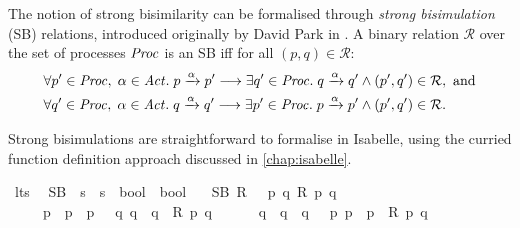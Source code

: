 \begin{isabellebody}
\begin{isamarkuptext}
The notion of strong bisimilarity can be formalised through \emph{strong bisimulation} (SB) relations, introduced originally by David Park in \cite{park81}. A binary relation $\mathcal{R}$ over the set of processes $\mathit{Proc}$ is an SB iff for all $(p,q) \in \mathcal{R}$:
\begin{align*}
&\forall p' \in \mathit{Proc},\; \alpha \in \mathit{Act} .\; p \xrightarrow{\alpha} p' \longrightarrow
\exists q' \in \mathit{Proc} .\; q \xrightarrow{\alpha} q' \wedge (p',q') \in \mathcal{R}, \text{ and}\\
&\forall q' \in \mathit{Proc},\; \alpha \in \mathit{Act} .\; q \xrightarrow{\alpha} q' \longrightarrow
\exists p' \in \mathit{Proc} .\; p \xrightarrow{\alpha} p' \wedge (p',q') \in \mathcal{R}.
\end{align*}%
\end{isamarkuptext}\isamarkuptrue%
%
\isadelimdocument
%
\endisadelimdocument
%
\isatagdocument
%
\isamarkuptrue%
%
\endisatagdocument
{\isafolddocument}%
%
\isadelimdocument
%
\endisadelimdocument
%
\begin{isamarkuptext}%
Strong bisimulations are straightforward to formalise in Isabelle, using the curried function definition approach discussed in \cref{chap:isabelle}.%
\end{isamarkuptext}\isamarkuptrue%
\isamarkupfalse%
\ lts\ \isanewline
\isanewline
%
\isanewline
{}\isamarkupfalse%
\ SB\ {\isacharcolon}{\kern0pt}{\isacharcolon}{\kern0pt}\ {\isacartoucheopen}{\isacharparenleft}{\kern0pt}{\isacharprime}{\kern0pt}s\ {\isasymRightarrow}\ {\isacharprime}{\kern0pt}s\ {\isasymRightarrow}\ bool{\isacharparenright}{\kern0pt}\ {\isasymRightarrow}\ bool{\isacartoucheclose}\isanewline
\ \ \ {\isacartoucheopen}SB\ R\ {\isasymequiv}\ {\isasymforall}\ p\ q{\isachardot}{\kern0pt}\ R\ p\ q\ {\isasymlongrightarrow}\ \isanewline
\ \ \ \ {\isacharparenleft}{\kern0pt}{\isasymforall}\ p{\isacharprime}{\kern0pt}\ {\isasymalpha}{\isachardot}{\kern0pt}\ p\ {\isasymlongmapsto}{\isasymalpha}\ p{\isacharprime}{\kern0pt}\ {\isasymlongrightarrow}\ {\isacharparenleft}{\kern0pt}{\isasymexists}\ q{\isacharprime}{\kern0pt}{\isachardot}{\kern0pt}\ {\isacharparenleft}{\kern0pt}q\ {\isasymlongmapsto}{\isasymalpha}\ q{\isacharprime}{\kern0pt}{\isacharparenright}{\kern0pt}\ {\isasymand}\ R\ p{\isacharprime}{\kern0pt}\ q{\isacharprime}{\kern0pt}{\isacharparenright}{\kern0pt}{\isacharparenright}{\kern0pt}\ {\isasymand}\isanewline
\ \ \ \ {\isacharparenleft}{\kern0pt}{\isasymforall}\ q{\isacharprime}{\kern0pt}\ {\isasymalpha}{\isachardot}{\kern0pt}\ q\ {\isasymlongmapsto}{\isasymalpha}\ q{\isacharprime}{\kern0pt}\ {\isasymlongrightarrow}\ {\isacharparenleft}{\kern0pt}{\isasymexists}\ p{\isacharprime}{\kern0pt}{\isachardot}{\kern0pt}\ {\isacharparenleft}{\kern0pt}p\ {\isasymlongmapsto}{\isasymalpha}\ p{\isacharprime}{\kern0pt}{\isacharparenright}{\kern0pt}\ {\isasymand}\ R\ p{\isacharprime}{\kern0pt}\ q{\isacharprime}{\kern0pt}{\isacharparenright}{\kern0pt}{\isacharparenright}{\kern0pt}{\isacartoucheclose}%

\end{isabellebody}
